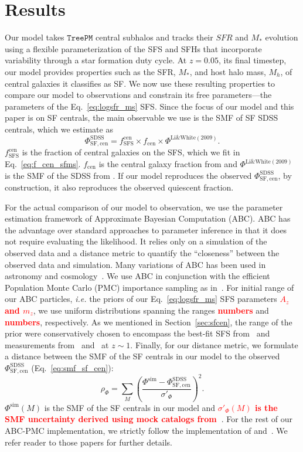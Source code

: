 \documentclass[12pt, letterpaper, preprint]{aastex}
\newcommand{\todo}[1]{{\bf \textcolor{red}{#1}}}
\newcommand{\beq}{\begin{equation}}
\newcommand{\eeq}{\end{equation}}
\begin{document}
\section{Results}
Our model takes $\mathtt{TreePM}$ central subhalos and tracks their $SFR$ 
and $M_*$ evolution using a flexible parameterization of the SFS and 
SFHs that incorporate variability through a star formation duty cycle.
At $z = 0.05$, its final timestep, our model provides properties such 
as the SFR, $M_*$, and host halo mass, $M_h$, of central galaxies it 
classifies as SF. We now use these resulting properties to compare our 
model to observations and constrain its free parameters---the parameters 
of the Eq.~\ref{eq:logsfr_ms} SFS. Since the focus of our model and this 
paper is on SF centrals, the main observable we use is the SMF of SF SDSS 
centrals, which we estimate as 
\beq \label{eq:smf_sf_cen} 
\Phi^\mathrm{SDSS}_\mathrm{SF,cen} = f^\mathrm{cen}_\mathrm{SFS} \times f_\mathrm{cen} \times \Phi^\mathrm{Li\&White(2009)}.
\eeq
$f^\mathrm{cen}_\mathrm{SFS}$ is the fraction of central galaxies on the 
SFS, which we fit in Eq.~\ref{eq:f_cen_sfms}. $f_\mathrm{cen}$ is the 
central galaxy fraction from \cite{wetzel2013} and $\Phi^\mathrm{Li\&White(2009)}$ 
is the SMF of the SDSS from \cite{li2009}. If our model reproduces the 
observed $\Phi^\mathrm{SDSS}_\mathrm{SF,cen}$, by construction, it also 
reproduces the observed quiescent fraction. 

For the actual comparison of our model to observation, we use the parameter 
estimation framework of Approximate Bayesian Computation (ABC). ABC has the 
advantage over standard approaches to parameter inference in that it does not 
require evaluating the likelihood. It relies only on a simulation of the observed 
data and a distance metric to quantify the ``closeness'' between the observed data
and simulation. Many variations of ABC has been used in astronomy and 
cosmology~\citep[\emph{e.g.}][]{cameron2012,weyant2013,ishida2015,alsing2018}. 
We use ABC in conjunction with the efficient Population Monte Carlo (PMC)
importance sampling as in~\citep{hahn2016, hahn2017}. For initial range of our
ABC particles, \emph{i.e.} the priors of our Eq.~\ref{eq:logsfr_ms} SFS parameters
\todo{$A_z$ and $m_z$}, we use uniform distributions spanning the ranges 
\todo{numbers} and \todo{numbers}, respectively. As we mentioned in Section~\ref{sec:sfcen}, 
the range of the prior were conservatively chosen to encompass the best-fit SFS from~\cite{speagle2014} 
and measurements from~\cite{moustakas2013} and~\cite{lee2015} at $z \sim 1$. 
Finally, for our distance metric, we formulate a distance between the SMF of
the SF centrals in our model to the observed $\Phi^\mathrm{SDSS}_\mathrm{SF,cen}$ 
(Eq.~\ref{eq:smf_sf_cen}): 
\beq
\rho_\Phi = \sum\limits_{M} \left( \frac{\Phi^\mathrm{sim} - \Phi^\mathrm{SDSS}_\mathrm{SF,cen}}{\sigma'_\Phi}\right)^2.
\eeq
$\Phi^\mathrm{sim}(M)$ is the SMF of the SF centrals in our model and 
\todo{$\sigma'_\Phi(M)$ is the SMF uncertainty derived using mock catalogs from~\cite{li2009}}. 
For the rest of our ABC-PMC implementation, we strictly follow the implementation 
of \cite{hahn2017b} and~\cite{hahn2017a}. We refer reader to those papers for 
further details.
\end{document}
